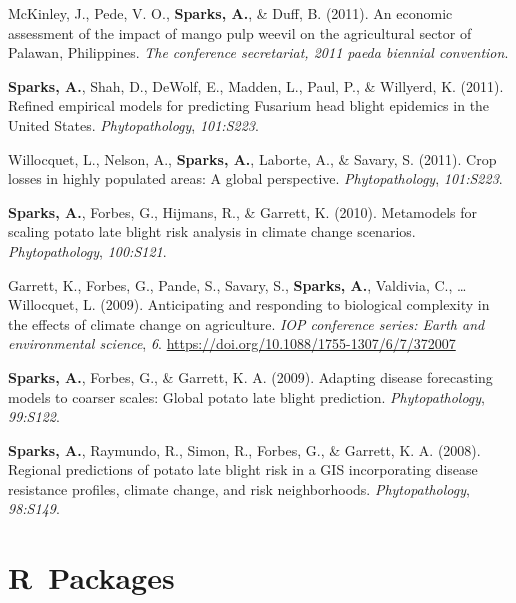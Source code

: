 \documentclass[11pt, a4paper]{awesome-cv}
\begin{document}
\leavevmode\hypertarget{ref-McKinley2011}{}%
McKinley, J., Pede, V. O., \textbf{Sparks, A.}, \& Duff, B. (2011). An economic assessment of the impact of mango pulp weevil on the agricultural sector of Palawan, Philippines. \emph{The conference secretariat, 2011 paeda biennial convention}.

\leavevmode\hypertarget{ref-Sparks2011a}{}%
\textbf{Sparks, A.}, Shah, D., DeWolf, E., Madden, L., Paul, P., \& Willyerd, K. (2011). Refined empirical models for predicting Fusarium head blight epidemics in the United States. \emph{Phytopathology}, \emph{101:S223}.

\leavevmode\hypertarget{ref-Willocquet2011}{}%
Willocquet, L., Nelson, A., \textbf{Sparks, A.}, Laborte, A., \& Savary, S. (2011). Crop losses in highly populated areas: A global perspective. \emph{Phytopathology}, \emph{101:S223}.

\leavevmode\hypertarget{ref-Sparks2010}{}%
\textbf{Sparks, A.}, Forbes, G., Hijmans, R., \& Garrett, K. (2010). Metamodels for scaling potato late blight risk analysis in climate change scenarios. \emph{Phytopathology}, \emph{100:S121}.

\leavevmode\hypertarget{ref-Garrett2009}{}%
Garrett, K., Forbes, G., Pande, S., Savary, S., \textbf{Sparks, A.}, Valdivia, C., \ldots{} Willocquet, L. (2009). Anticipating and responding to biological complexity in the effects of climate change on agriculture. \emph{IOP conference series: Earth and environmental science}, \emph{6}. \url{https://doi.org/10.1088/1755-1307/6/7/372007}

\leavevmode\hypertarget{ref-Sparks2009}{}%
\textbf{Sparks, A.}, Forbes, G., \& Garrett, K. A. (2009). Adapting disease forecasting models to coarser scales: Global potato late blight prediction. \emph{Phytopathology}, \emph{99:S122}.

\leavevmode\hypertarget{ref-Sparks2008b}{}%
\textbf{Sparks, A.}, Raymundo, R., Simon, R., Forbes, G., \& Garrett, K. A. (2008). Regional predictions of potato late blight risk in a GIS incorporating disease resistance profiles, climate change, and risk neighborhoods. \emph{Phytopathology}, \emph{98:S149}.

\endgroup

\hypertarget{r-packages}{%
\section{R~Packages}\label{r-packages}}

\begingroup
\setlength{\parindent}{-0.5in}
\setlength{\leftskip}{0.5in}
\end{document}
